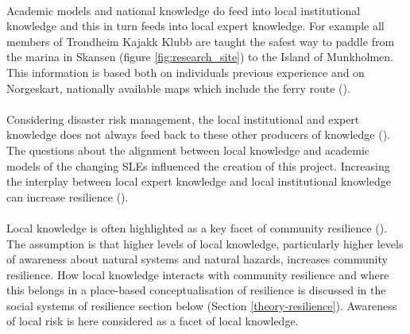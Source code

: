 \paragraph{}

Academic models and national knowledge do feed into local institutional knowledge and this in turn feeds into local expert knowledge. For example all members of Trondheim Kajakk Klubb are taught the safest way to paddle from the marina in Skansen (figure \ref{fig:research_site}) to the Island of Munkholmen. This information is based both on individuals previous experience and on Norgeskart, nationally available maps which include the ferry route (\cite{kartverket_norgeskart_2023}). 

\paragraph{}
Considering disaster risk management, the local institutional and expert knowledge does not always feed back to these other producers of knowledge (\cite{rod_integrated_2012}). The questions about the alignment between local knowledge and academic models of the changing SLEs influenced the creation of this project. Increasing the interplay between local expert knowledge and local institutional knowledge can increase resilience (\cite{setten_we_2019}).

\paragraph{}

Local knowledge is often highlighted as a key facet of community resilience (\cite{setten_we_2019}). The assumption is that higher levels of local knowledge, particularly higher levels of awareness about natural systems and natural hazards, increases community resilience.  How local knowledge interacts with community resilience and where this belongs in a place-based conceptualisation of resilience is discussed in the social systems of resilience section below (Section \ref{theory-resilience}). Awareness of local risk is here considered as a facet of local knowledge.  


 

